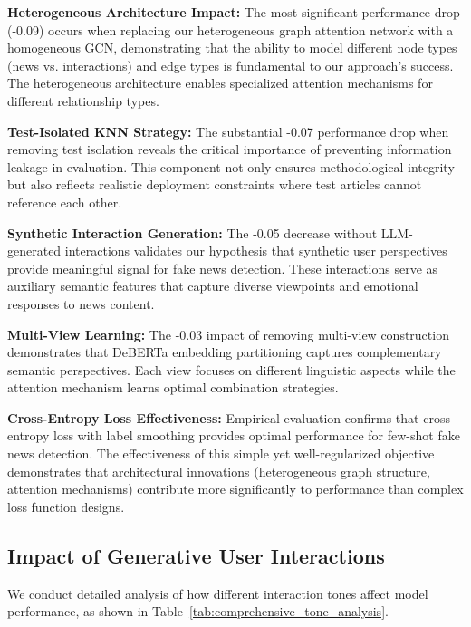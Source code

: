 \textbf{Heterogeneous Architecture Impact:} The most significant performance drop (-0.09) occurs when replacing our heterogeneous graph attention network with a homogeneous GCN, demonstrating that the ability to model different node types (news vs. interactions) and edge types is fundamental to our approach's success. The heterogeneous architecture enables specialized attention mechanisms for different relationship types.

\textbf{Test-Isolated KNN Strategy:} The substantial -0.07 performance drop when removing test isolation reveals the critical importance of preventing information leakage in evaluation. This component not only ensures methodological integrity but also reflects realistic deployment constraints where test articles cannot reference each other.

\textbf{Synthetic Interaction Generation:} The -0.05 decrease without LLM-generated interactions validates our hypothesis that synthetic user perspectives provide meaningful signal for fake news detection. These interactions serve as auxiliary semantic features that capture diverse viewpoints and emotional responses to news content.

\textbf{Multi-View Learning:} The -0.03 impact of removing multi-view construction demonstrates that DeBERTa embedding partitioning captures complementary semantic perspectives. Each view focuses on different linguistic aspects while the attention mechanism learns optimal combination strategies.

\textbf{Cross-Entropy Loss Effectiveness:} Empirical evaluation confirms that cross-entropy loss with label smoothing provides optimal performance for few-shot fake news detection. The effectiveness of this simple yet well-regularized objective demonstrates that architectural innovations (heterogeneous graph structure, attention mechanisms) contribute more significantly to performance than complex loss function designs.

\subsection{Impact of Generative User Interactions}

We conduct detailed analysis of how different interaction tones affect model performance, as shown in Table~\ref{tab:comprehensive_tone_analysis}.

